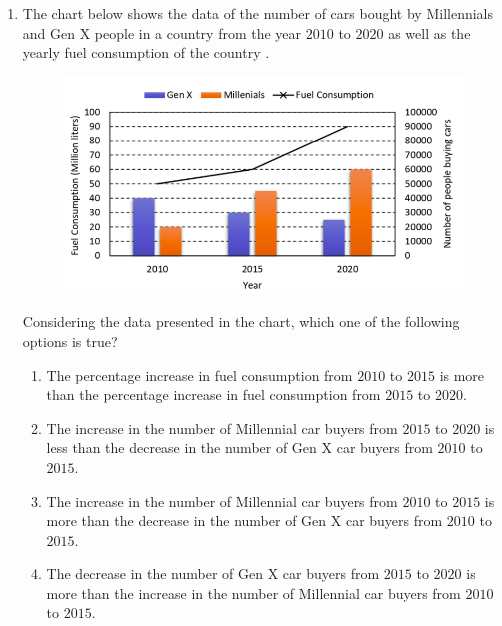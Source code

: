 \documentclass[journal,12pt,onecolumn]{IEEEtran}
\theoremstyle{remark}
\begin{document}
\begin{enumerate}[start=1, label=Q.\arabic*]
    \item The chart below shows the data of the number of cars bought by Millennials and Gen X people in a country from the year $2010$ to $2020$ as well as the yearly fuel consumption of the country .
    \begin{figure}[H]
        \centering
        \includegraphics[width=0.8\columnwidth]{Figures/q8.png}
        \caption*{}
    \end{figure}
    Considering the data presented in the chart, which one of the following options is true?
    \begin{enumerate}
        \item The percentage increase in fuel consumption from $2010$ to $2015$ is more than the percentage increase in fuel consumption from $2015$ to $2020$.
        \item The increase in the number of Millennial car buyers from $2015$ to $2020$ is less than the decrease in the number of Gen X car buyers from $2010$ to $2015$.
        \item The increase in the number of Millennial car buyers from $2010$ to $2015$ is more than the decrease in the number of Gen X car buyers from $2010$ to $2015$.
        \item The decrease in the number of Gen X car buyers from $2015$ to $2020$ is more than the increase in the number of Millennial car buyers from $2010$ to $2015$.
    \end{enumerate}


\end{enumerate}
\end{document}
